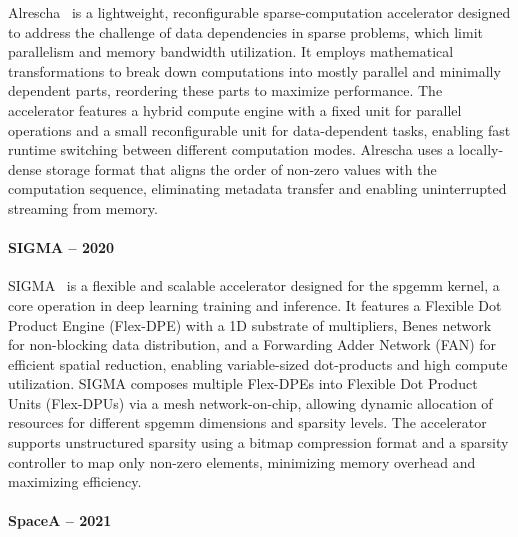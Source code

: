 Alrescha~\cite{Asgari2020_Alrescha} is a lightweight, reconfigurable sparse-computation accelerator designed to address the challenge of data dependencies in sparse problems, which limit parallelism and memory bandwidth utilization.
It employs mathematical transformations to break down computations into mostly parallel and minimally dependent parts, reordering these parts to maximize performance.
The accelerator features a hybrid compute engine with a fixed unit for parallel operations and a small reconfigurable unit for data-dependent tasks, enabling fast runtime switching between different computation modes.
Alrescha uses a locally-dense storage format that aligns the order of non-zero values with the computation sequence, eliminating \gls{metadata} transfer and enabling uninterrupted streaming from memory.

\paragraph{SIGMA -- 2020}

SIGMA~\cite{Qin2020_SIGMA} is a flexible and scalable accelerator designed for the \acrshort{spgemm} kernel, a core operation in deep learning training and inference.
It features a Flexible Dot Product Engine (Flex-DPE) with a 1D substrate of multipliers, Benes network for non-blocking data distribution, and a Forwarding Adder Network (FAN) for efficient spatial \gls{reduction}, enabling variable-sized dot-products and high compute utilization.
SIGMA composes multiple Flex-DPEs into Flexible Dot Product Units (Flex-DPUs) via a mesh network-on-chip, allowing dynamic allocation of resources for different \acrshort{spgemm} dimensions and sparsity levels.
The accelerator supports unstructured sparsity using a bitmap compression format and a sparsity controller to map only non-zero elements, minimizing memory overhead and maximizing efficiency.

\paragraph{SpaceA -- 2021}

